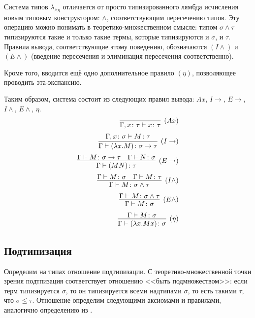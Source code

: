 \documentclass[../main.tex]{subfiles}
\begin{document}
Система типов $\lambda_{\wedge \eta}$ отличается от просто типизированного лямбда исчисления новым типовым конструктором: $\wedge$, соответствующим пересечению типов. Эту операцию можно понимать в теоретико-множественном смысле: типом $\sigma \wedge \tau$ типизируются такие и только такие термы, которые типизируются и $\sigma$, и $\tau$. Правила вывода, соответствующие этому поведению, обозначаются $(I\wedge)$ и $(E\wedge)$ (введение пересечения и элиминация пересечения соответственно). 

Кроме того, вводится ещё одно дополнительное правило $(\eta)$, позволяющее проводить эта-экспансию. 

Таким образом, система состоит из следующих правил вывода: $Ax$, $I\to$, $E\to$, $I\wedge$, $E\wedge$, $\eta$.
\begin{equation} \label{rules eta}
\begin{aligned}
\infer[(Ax)]{\Gamma, x \colon \tau \vdash x \colon \tau}{}\\[2pt]
\infer[(I\to)]{\Gamma \vdash (\lambda x . M) \colon \sigma \to \tau}{\Gamma, x \colon \sigma \vdash M \colon \tau}\\[2pt]
\infer[(E\to)]{\Gamma \vdash (MN) \colon \tau}{\Gamma \vdash M \colon \sigma \to \tau & \Gamma \vdash N \colon \sigma}\\[2pt]
\infer[(I\wedge)]{\Gamma \vdash M \colon \sigma \wedge \tau}{\Gamma \vdash M \colon \sigma & \Gamma \vdash M \colon \tau}\\[2pt]
\infer[(E\wedge)]{\Gamma \vdash M \colon \sigma}{\Gamma \vdash M \colon \sigma \wedge \tau}\\[2pt]
\infer[(\eta)]{\Gamma \vdash (\lambda x . M x) \colon \sigma}{\Gamma \vdash M \colon \sigma}

\end{aligned}
\end{equation}

\subsection{Подтипизация}


Определим на типах отношение подтипизации. С теоретико-множественной точки зрения подтпизация соответствует отношению <<быть подмножеством>>: если терм типизируется $\sigma$, то он типизируется всеми надтипами $\sigma$, то есть такими $\tau$, что $\sigma \leqslant \tau$. Отношение определим следующими аксиомами и правилами, аналогично определению из \cite{hindley_1982}.
\end{document}
